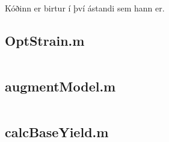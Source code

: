 \documentclass[11pt]{article}
\begin{document}
Kóðinn er birtur í því ástandi sem hann er.
\subsection{OptStrain.m}
\label{code:OptStrain}
\inputminted[linenos]{matlab}{../OptStrain.m}
\subsection{augmentModel.m}
\label{code:augmentModel}
\inputminted[linenos]{matlab}{../augmentModel.m}
\subsection{calcBaseYield.m}
\label{code:calcBaseYield}
\inputminted[linenos]{matlab}{../calcBaseYield.m}


\end{document}

